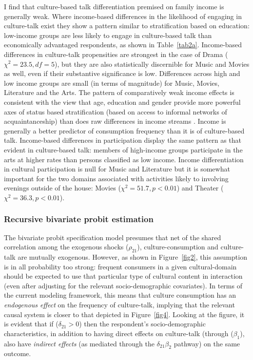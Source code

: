 \documentclass[11pt]{article}
\begin{document}
I find that culture-based talk differentiation premised on family income is generally weak.   Where income-based differences in the likelihood of engaging in culture-talk exist they show a pattern similar to stratification based on education: low-income groups are less likely to engage in culture-based talk than economically advantaged respondents, as shown in Table~\ref{tab2a}.   Income-based differences in culture-talk propensities are strongest in the case of Drama ($\chi^{2}=23.5, df=5$), but they are also statistically discernible for Music and Movies as well, even if their substantive significance is low. Differences across high and low income groups are small (in terms of magnitude) for Music, Movies, Literature and the Arts.   The pattern of comparatively weak income effects is consistent with the view that age, education and gender provide more powerful axes of status based stratification (based on access to informal networks of acquaintanceship) than does raw differences in income streams  \citep{dimaggio_useem78a}.   Income is generally a better predictor of consumption frequency than it is of culture-based talk.  Income-based differences in participation display the same pattern as that evident in culture-based talk: members of high-income groups participate in the arts at higher rates than persons classified as low income.  Income differentiation in cultural participation is null for Music and Literature but it is somewhat important for the two domains associated with activities likely to involving evenings outside of the house: Movies ($\chi^{2}=51.7, p<0.01$) and Theater ($\chi^{2}=36.3, p<0.01$).  

\subsubsection{Recursive bivariate probit estimation}
The bivariate probit specification model presumes that net of the shared correlation among the exogenous shocks ($\rho_{21}$), culture-consumption  and culture-talk are mutually exogenous.  However, as shown in Figure~\ref{fig2}, this assumption is in all probability too strong:  frequent consumers in a given cultural-domain should be expected to use that particular type of cultural content in interaction (even after adjusting for the relevant socio-demographic covariates).   In terms of the current modeling framework, this means that culture consumption has an \emph{endogenous effect }on the frequency of culture-talk, implying that the relevant causal system is closer to that depicted in Figure~\ref{fig4}.   Looking at the figure, it is evident that if ($\delta_{21}>0$) then the respondent's socio-demographic characteristics, in addition to having direct effects on culture-talk (through ($\beta_{1}$), also have \emph{indirect effects} (as mediated through the $\delta_{21}\beta_{2}$ pathway) on the same outcome.  
\end{document}

